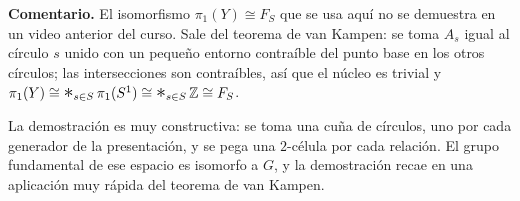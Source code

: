 \documentclass[11pt]{article}
\begin{document}
\medskip\noindent\textbf{Comentario.} El isomorfismo $\pi_1(Y)\cong F_S$ que se usa aquí no se demuestra en un video anterior del curso. Sale del teorema de van Kampen: se toma $A_s$ igual al círculo $s$ unido con un pequeño entorno contraíble del punto base en los otros círculos; las intersecciones son contraíbles, así que el núcleo es trivial y $\pi_1(Y)\cong\mathop{\scalebox{1.4}{$*$}}_{s\in S}\pi_1(S^1)\cong\mathop{\scalebox{1.4}{$*$}}_{s\in S}\mathbb{Z}\cong F_S$.


La demostración es muy constructiva: se toma una cuña de círculos, uno por cada generador de la presentación, y se pega una $2$-célula por cada relación. El grupo fundamental de ese espacio es isomorfo a $G$, y la demostración recae en una aplicación muy rápida del teorema de van Kampen.

\begin{erratas}
\end{erratas}
\end{document}
